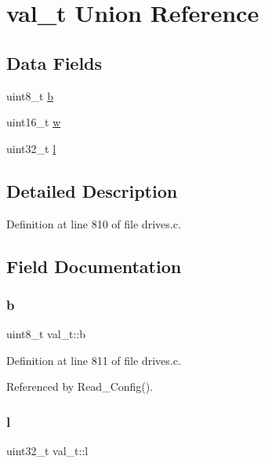 \hypertarget{unionval__t}{}\section{val\+\_\+t Union Reference}
\label{unionval__t}
\subsection*{Data Fields}
\begin{DoxyCompactItemize}
\item 
uint8\+\_\+t \hyperlink{unionval__t_aa1beb825450163cb6c0f3bfeea7a8098}{b}
\item 
uint16\+\_\+t \hyperlink{unionval__t_a35ceb0f111824a2835370671131c38c0}{w}
\item 
uint32\+\_\+t \hyperlink{unionval__t_a9104daa7fde3f83545528fa75871bc84}{l}
\end{DoxyCompactItemize}


\subsection{Detailed Description}


Definition at line 810 of file drives.\+c.



\subsection{Field Documentation}
\mbox{\label{unionval__t_aa1beb825450163cb6c0f3bfeea7a8098}} 
\subsubsection{\texorpdfstring{b}{b}}
{\footnotesize\ttfamily uint8\+\_\+t val\+\_\+t\+::b}



Definition at line 811 of file drives.\+c.



Referenced by Read\+\_\+\+Config().

\mbox{\label{unionval__t_a9104daa7fde3f83545528fa75871bc84}} 
\subsubsection{\texorpdfstring{l}{l}}
{\footnotesize\ttfamily uint32\+\_\+t val\+\_\+t\+::l}




